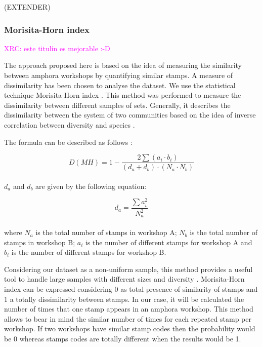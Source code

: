 \documentclass[review]{elsarticle}
\newcommand{\memo}[2]{\textcolor{#1}{#2}}
\newcommand{\xavi}[1]{\memo{magenta}{XRC: #1\\}}
\begin{document}
(EXTENDER)

\subsubsection{Morisita-Horn index}


\xavi{este titulín es mejorable :-D}


The approach proposed here is based on the idea of measuring the similarity between amphora workshops by quantifying similar stamps. A measure of dissimilarity has been chosen to analyse the dataset. We use the statistical technique Morisita-Horn index \citep{morisita_measuring_1959, horn_measurement_1966}. This method was performed to measure the dissimilarity between different samples of sets. Generally, it describes the dissimilarity between the system of two communities based on the idea of inverse correlation between diversity and species \citep{magurran_why_1988}.

The formula can be described as follows \citep{magurran_measuring_2013}:

\begin{equation}
D(MH) = 1- \frac{2 \sum(a_{i} \cdot b_{i})}{(d_{a} + d_{b}) \cdot (N_{a} \cdot N_{b})}
\end{equation} \\

$d_{a}$ and $d_{b}$ are given by the following equation:

\begin{equation}
d_{a} = \frac{\sum a_{i}^{2}}{N_{a}^{2}} 
\end{equation} \\

where $N_{a}$ is the total number of stamps in workshop A; $N_{b}$ is the total number of stamps in workshop B; $a_{i}$ is the number of different stamps for workshop A and $b_{i}$ is the number of different stamps for workshop B.

Considering our dataset as a non-uniform sample, this method provides a useful tool to handle large samples with different sizes and diversity \citep{wolda_similarity_1981}. Morisita-Horn index can be expressed considering 0 as total presence of similarity of stamps and 1 a totally dissimilarity between stamps. In our case, it will be calculated the number of times that one stamp appears in an amphora workshop. This method allows to bear in mind the similar number of times for each repeated stamp per workshop. If two workshops have similar stamp codes then the probability would be 0 whereas stamps codes are totally different when the results would be 1. 
\end{document}
